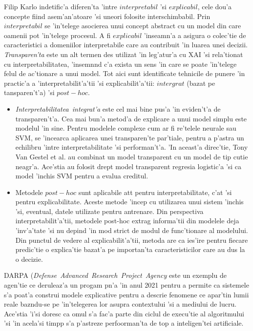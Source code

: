 \documentclass[12pt,a4paper,twoside]{report}
\begin{document}
Filip Karlo \cite{Dosilovic2018ExplainableSurvey} indetific'a diferen'ta 'intre $interpretabil$ 'si $explicabil$, cele dou'a concepte fiind asem'an'atoare 'si uneori folosite interschimbabil. Prin $interpretabil$ se 'in'telege asocierea unui concept abstract cu un model din care oamenii pot 'in'telege procesul. A fi $explicabil$ 'inseamn'a a asigura o colec'tie de caracteristici a domeniilor interpretabile care au contribuit 'in luarea unei decizii. {\it Transparen'ta
} este un alt termen des utilizat 'in leg'atur'a cu XAI 'si rela'tionat cu interpretabilitatea, 'insemn\ia nd c'a exista un sens 'in care se poate 'in'telege felul de ac'tionare a unui model. Tot aici sunt identificate tehnicile de punere 'in practic'a a 'interpretabilit'a'tii 'si explicabilit'a'tii: $intergrat$ (bazat pe tansparen't'a) 'si $post-hoc$.
\begin{itemize}


    \item {\it Interpretabilitatea\ integrat'a} este cel mai bine pus'a 'in eviden't'a de transparen't'a. Cea mai bun'a metod'a de explicare a unui model simplu este modelul 'in sine. Pentru modelele complexe cum ar fi re'telele neurale sau SVM, se 'incearca aplicarea unei transparen'te par'tiale, pentru a p'astra un echilibru 'intre interpretabilitate 'si performan't'a. 'In aceast'a direc'tie, Tony Van Gestel et al. \cite{VanGestel2016LinearMachines} au combinat un model transparent cu un model de tip cutie neagr'a. Ace'stia au folosit drept model transparent regresia logistic'a 'si ca model 'inchis SVM pentru a evalua creditul. 

    \item  Metodele $post-hoc$ sunt aplicabile at\ia t pentru interpretabilitate, c'at 'si pentru explicabilitate. Aceste metode 'incep cu utilizarea unui sistem 'inchis 'si, eventual, datele utilizate pentru antrenare. Din perspectiva interpretabilit'a'tii, metodele post-hoc extrag informa'tii din modelele deja 'inv'a'tate 'si nu depind 'in mod strict de modul de func'tionare al modelului. Din punctul de vedere al explicabilit'a'tii, metoda are ca ies'ire pentru fiecare predic'tie o explica'tie bazat'a pe importan'ta caracteristicilor care au dus la o decizie.
\end{itemize}


DARPA ({\it Defense\ Advanced\ Research\ Project\ Agency} \cite{darpaXAI} este un exemplu de agen'tie ce deruleaz'a un progam p\ia n'a 'in anul 2021 pentru a permite ca sistemele s'a poat'a construi modele explicative pentru a descrie fenomene ce apar'tin lumii reale baz\ia ndu-se pe 'in'telegerea lor asupra contextului 'si a mediului de lucru. Ace'stia 'i'si doresc ca omul s'a fac'a parte din ciclul de execu'tie al algoritmului 'si 'in acela'si timpp s'a p'astreze perfoorman'ta de top a inteligen'tei artificiale. 
\end{document}
